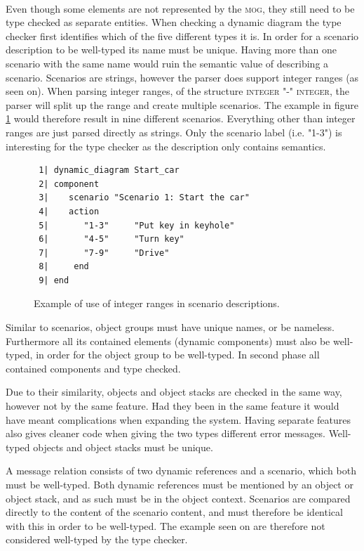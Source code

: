 \paragraph{}
Even though some elements are not represented by the \textsc{mog}, they still need to be type checked as separate entities. When checking a dynamic diagram the type checker first identifies which of the five different types it is. In order for a scenario description to be well-typed its name must be unique. Having more than one scenario with the same name would ruin the semantic value of describing a scenario. Scenarios are strings, however the parser does support integer ranges (as seen on\cite[pp. 379-380]{walden1995}). When parsing integer ranges, of the structure \textsc{integer} "-" \textsc{integer}, the parser will split up the range and create multiple scenarios. The example in figure \ref{fig:integer_range} would therefore result in nine different scenarios. Everything other than integer ranges are just parsed directly as strings. Only the scenario label (i.e. "1-3") is interesting for the type checker as the description only contains semantics.

\begin{figure}[H]
{\footnotesize
\begin{verbatim}
 1| dynamic_diagram Start_car
 2| component
 3|    scenario "Scenario 1: Start the car"
 4|    action
 5|       "1-3"     "Put key in keyhole"
 6|       "4-5"     "Turn key"
 7|       "7-9"     "Drive"
 8|     end
 9| end
\end{verbatim}
}
\caption{Example of use of integer ranges in scenario descriptions.}
\label{fig:integer_range}
\end{figure}

Similar to scenarios, object groups must have unique names, or be nameless. Furthermore all its contained elements (dynamic components) must also be well-typed, in order for the object group to be well-typed. In second phase all contained components and type checked.

Due to their similarity, objects and object stacks are checked in the same way, however not by the same feature. Had they been in the same feature it would have meant complications when expanding the system. Having separate features also gives cleaner code when giving the two types different error messages. Well-typed objects and object stacks must be unique.

A message relation consists of two dynamic references and a scenario, which both must be well-typed. Both dynamic references must be mentioned by an object or object stack, and as such must be in the object context. Scenarios are compared directly to the content of the scenario content, and must therefore be identical with this in order to be well-typed. The example seen on \cite[p. 380]{walden1995} are therefore not considered well-typed by the type checker.

